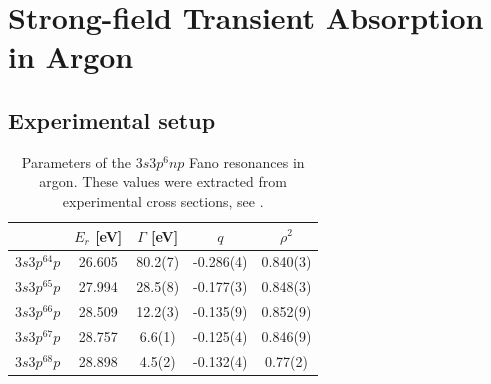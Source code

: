 
\section{Strong-field Transient Absorption in Argon}
\label{sec:ATS_ar}

\subsection{Experimental setup}
\label{sec:ATS_ar_exp_setup}


\begin{table}[]
	\centering
	\begin{tabular}{|ccccc|}
		\hline\hline
		\multicolumn{1}{|c}{}  & $E_r$ [eV]   & $\Gamma$ [eV]   & $q$         & $\rho^2$     \\ \hline
		$3s3p^64p$              & 26.605 & 80.2(7) & -0.286(4) & 0.840(3) \\
		$3s3p^65p$              & 27.994 & 28.5(8) & -0.177(3) & 0.848(3) \\
		$3s3p^66p$              & 28.509 & 12.2(3) & -0.135(9) & 0.852(9) \\
		$3s3p^67p$              & 28.757 & 6.6(1)  & -0.125(4) & 0.846(9) \\
		$3s3p^68p$              & 28.898 & 4.5(2)  & -0.132(4) & 0.77(2)  \\ \hline\hline
	\end{tabular}
	\caption[Parameters of the $3s3p^6np$ Fano resonances in argon]{Parameters of the $3s3p^6np$ Fano resonances in argon. These values were extracted from experimental cross sections, see \cite{caretteMulticonfigurationalHartreeFockClosecoupling2013, wuElectronimpactStudyValence1995, berrahAngulardistributionParametersAndRmatrix1996}.}
	\label{table:fano_params}
\end{table}

